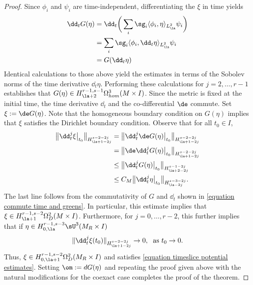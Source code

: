 \documentclass[hidelinks, 12pt, oneside, reqno]{amsart}
\begin{document}
\begin{proof}
Since $\phi_i$ and $\psi_i$ are time-independent, differentiating the $\xi$ in time yields
\begin{align}\label{equation commute time and greens}
    \dd_t G(\eta) &= \dd_t \bigg(\sum_i \sg_i \langle \phi_i, \eta \rangle_{L^2_\la} \psi_i\bigg)\\
    &= \sum_i \sg_i \langle \phi_i, \dd_t \eta \rangle_{L^2_\la} \psi_i \nonumber\\
    &= G(\dd_t \eta) \nonumber
\end{align}
Identical calculations to those above yield the estimates in terms of the Sobolev norms of the time derivative $\dd_t \eta$. Performing these calculations for $j = 2,\ldots,r-1$ establishes that $G(\eta) \in H^{r-1, s-1}_{\la+2}\Omega^3_{hom} (M \times I)$. Since the metric is fixed at the initial time, the time derivative $\dd_t$ and the co-differential $\de$ commute. Set $\xi := \de G(\eta)$. Note that the homogeneous boundary condition on $G(\eta)$ implies that $\xi$ satisfies the Dirichlet boundary condition. Observe that for all $t_0 \in I$,
\begin{align*}
    \big\|\dd_t^j \xi \big|_{t_0} \big\|_{H_{\la+1 - 2j}^{s-2-2j}} &= \big\|\dd_t^j \de G(\eta) \big|_{t_0} \big\|_{H_{\la+1 - 2j}^{s-2-2j}} \\
    &= \big\|\de \dd_t^j G( \eta) \big|_{t_0} \big\|_{H_{\la+1 - 2j}^{s-2-2j}} \\
    &\le \big\|\dd_t^j G( \eta )\big|_{t_0} \big\|_{H_{\la+2 - 2j}^{s-1-2j}} \\
    &\le C_M \big\|\dd_t^j \eta \big|_{t_0} \big\|_{H_{\la-2j}^{s-3-2j}}.
\end{align*}
The last line follows from the commutativity of $G$ and $\dd_t$ shown in \eqref{equation commute time and greens}. In particular, this estimate implies that $\xi \in H^{r-1, s-2}_{\la+1}\Omega^2_{D} (M \times I)$. Furthermore, for $j = 0,\ldots, r-2$, this further implies that if $\eta \in H_{0,\la}^{r-1,s-3}\sU^3(M_R \times I)$
\[
\|\dd_t^j \xi (t_0)\|_{H_{\la+1 - 2j}^{s-2-2j}} \rightarrow 0, \; \text{ as } t_0 \rightarrow 0.
\]
Thus, $\xi \in H_{0,\la+1}^{r-1,s-2}\Omega_D^2(M_R \times I)$ and satisfies \eqref{equation timeslice potential estimates}. Setting $\om :=  dG(\eta)$ and repeating the proof given above with the natural modifications for the coexact case completes the proof of the theorem.
\end{proof}
\end{document}
